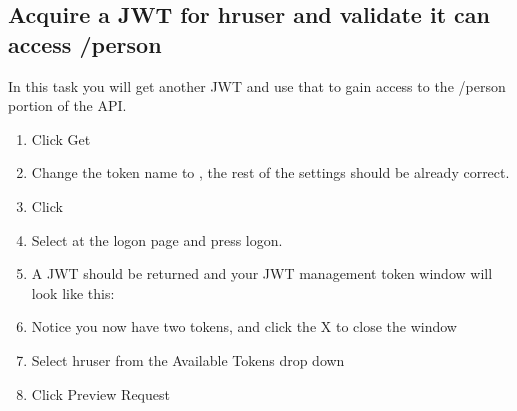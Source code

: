 \documentclass[letterpaper,10pt,english]{sphinxmanual}
\begin{document}
\subsection{Acquire a JWT for hruser and validate it can access /person}
\label{\detokenize{class1/module3/module3:acquire-a-jwt-for-hruser-and-validate-it-can-access-person}}
In this task you will get another JWT and use that to gain access to the
/person portion of the API.
\begin{enumerate}
\item {} 
Click Get 

\end{enumerate}
\begin{quote}

\noindent{}
\end{quote}
\begin{enumerate}
\setcounter{enumi}{1}
\item {} 
Change the token name to , the rest of the settings should
be already correct.

\end{enumerate}
\begin{quote}

\noindent{}
\end{quote}
\begin{enumerate}
\setcounter{enumi}{2}
\item {} 
Click 

\item {} 
Select  at the logon page and press logon.

\end{enumerate}
\begin{quote}

\noindent{}
\end{quote}
\begin{enumerate}
\setcounter{enumi}{4}
\item {} 
A JWT should be returned and your JWT management token window will
look like this:

\end{enumerate}
\begin{quote}

\noindent{}
\end{quote}
\begin{enumerate}
\setcounter{enumi}{5}
\item {} 
Notice you now have two tokens, and click the X to close the window

\item {} 
Select hruser from the Available Tokens drop down

\item {} 
Click Preview Request

\end{enumerate}
\end{document}
